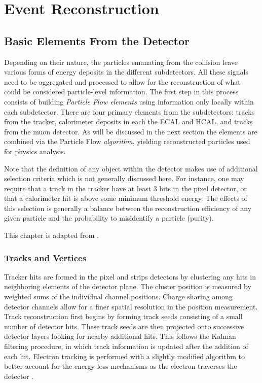 \chapter{Event Reconstruction}
\label{chap:eventreco}

\section{Basic Elements From the Detector} 

Depending on their nature, the particles emanating from the collision leave various forms of energy deposits in the different subdetectors. All these signals need to be aggregated and processed to allow for the reconstruction of what could be considered particle-level information. The first step in this process consists of building \textit{Particle Flow elements} using information only locally within each subdetector. There are four primary elements from the subdetectors: tracks from the tracker, calorimeter deposits in each the ECAL and HCAL, and tracks from the muon detector. As will be discussed in the next section the elements are combined via the Particle Flow \textit{algorithm}, yielding reconstructed particles used for physics analysis.

Note that the definition of any object within the detector makes use of additional selection criteria which is not generally discussed here. For instance, one may require that a track in the tracker have at least 3 hits in the pixel detector, or that a calorimeter hit is above some minimum threshold energy. The effects of this selection is generally a balance between the reconstruction efficiency of any given particle and the probability to misidentify a particle (purity).

This chapter is adapted from \cite{CMS-PRF-14-001}.

\subsection{Tracks and Vertices}

Tracker hits are formed in the pixel and strips detectors by clustering any hits in neighboring elements of the detector plane. The cluster position is measured by weighted sums of the individual channel positions. Charge sharing among detector channels allow for a finer spatial resolution in the position measurement. Track reconstruction first begins by forming track seeds consisting of a small number of detector hits. These track seeds are then projected onto successive detector layers looking for nearby additional hits. This follows the Kalman filtering procedure, in which track information is updated after the addition of each hit. Electron tracking is performed with a slightly modified algorithm to better account for the energy loss mechanisms as the electron traverses the detector \cite{trackerreco}.

